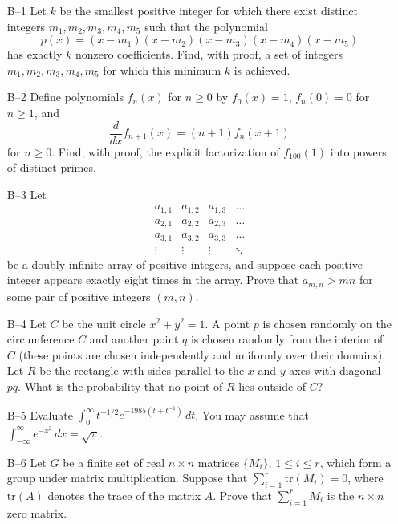 \documentclass[amssymb,twocolumn,pra,10pt,aps]{revtex4-1}
\begin{document}
\begin{itemize}
\item[B--1]
Let $k$ be the smallest positive integer for which there exist
distinct integers $m_1, m_2, m_3, m_4, m_5$ such that the polynomial
\[
p(x) = (x-m_1)(x-m_2)(x-m_3)(x-m_4)(x-m_5)
\]
has exactly $k$ nonzero coefficients. Find, with proof, a set of
integers $m_1, m_2, m_3, m_4, m_5$ for which this minimum $k$ is achieved.

\item[B--2]
Define polynomials $f_n(x)$ for $n \geq 0$ by $f_0(x)=1$, $f_n(0)=0$
for $n \geq 1$, and
\[
\frac{d}{dx} f_{n+1}(x) = (n+1)f_n(x+1)
\]
for $n \geq 0$. Find, with proof, the explicit factorization of
$f_{100}(1)$ into powers of distinct primes.

\item[B--3]
Let
\[
\begin{array}{cccc} a_{1,1} & a_{1,2} & a_{1,3} & \dots \\
a_{2,1} & a_{2,2} & a_{2,3} & \dots \\
a_{3,1} & a_{3,2} & a_{3,3} & \dots \\
\vdots & \vdots & \vdots & \ddots
\end{array}
\]
be a doubly infinite array of positive integers, and suppose each
positive integer appears exactly eight times in the array. Prove that
$a_{m,n} > mn$ for some pair of positive integers $(m,n)$.

\item[B--4]
Let $C$ be the unit circle $x^2+y^2=1$. A point $p$ is chosen randomly
on the circumference $C$ and another point $q$ is chosen randomly from
the interior of $C$ (these points are chosen independently and
uniformly over their domains). Let $R$ be the rectangle with sides
parallel to the $x$ and $y$-axes with diagonal $pq$. What is the
probability that no point of $R$ lies outside of $C$?

\item[B--5]
Evaluate $\int_0^\infty t^{-1/2}e^{-1985(t+t^{-1})}\,dt$. You may
assume that $\int_{-\infty}^\infty e^{-x^2}\,dx = \sqrt{\pi}$.

\item[B--6]
Let $G$ be a finite set of real $n\times n$ matrices $\{M_i\}$, $1
\leq i \leq r$, which form a group under matrix
multiplication. Suppose that $\sum_{i=1}^r \mathrm{tr}(M_i)=0$, where
$\mathrm{tr}(A)$
denotes the trace of the matrix $A$. Prove that $\sum_{i=1}^r M_i$ is
the $n \times n$ zero matrix.

\end{itemize}
\end{document}

